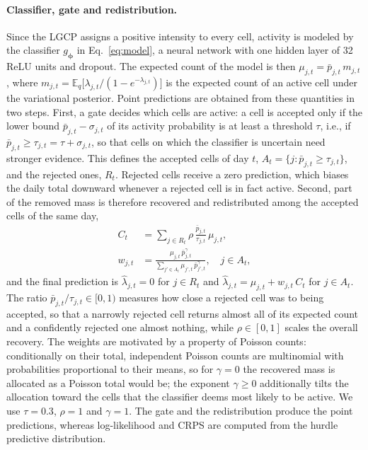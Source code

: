 \paragraph{Classifier, gate and redistribution.}
Since the LGCP assigns a positive intensity to every cell, activity is modeled by the classifier $g_{\boldsymbol{\phi}}$ in Eq.~\eqref{eq:model}, a neural network with one hidden layer of 32 ReLU units and dropout. The expected count of the model is then $\mu_{j,t}=\bar p_{j,t}\,m_{j,t}$, where $m_{j,t}=\mathbb{E}_q\bigl[\lambda_{j,t}/(1-e^{-\lambda_{j,t}})\bigr]$ is the expected count of an active cell under the variational posterior. Point predictions are obtained from these quantities in two steps. First, a gate decides which cells are active: a cell is accepted only if the lower bound $\bar p_{j,t}-\sigma_{j,t}$ of its activity probability is at least a threshold $\tau$, i.e., if $\bar p_{j,t}\geq\tau_{j,t}=\tau+\sigma_{j,t}$, so that cells on which the classifier is uncertain need stronger evidence. This defines the accepted cells of day $t$, $A_t=\{j:\bar p_{j,t}\geq\tau_{j,t}\}$, and the rejected ones, $R_t$. Rejected cells receive a zero prediction, which biases the daily total downward whenever a rejected cell is in fact active. Second, part of the removed mass is therefore recovered and redistributed among the accepted cells of the same day,
\begin{equation}
    \begin{aligned}
        C_t&=\sum_{j\in R_t}\rho\,\frac{\bar p_{j,t}}{\tau_{j,t}}\,\mu_{j,t},\\
        w_{j,t}&=\frac{\mu_{j,t}\,\bar p_{j,t}^{\gamma}}{\sum_{j'\in A_t}\mu_{j',t}\,\bar p_{j',t}^{\gamma}},\quad j\in A_t,
    \end{aligned}
\end{equation}
and the final prediction is $\widehat{\lambda}_{j,t}=0$ for $j\in R_t$ and $\widehat{\lambda}_{j,t}=\mu_{j,t}+w_{j,t}\,C_t$ for $j\in A_t$. The ratio $\bar p_{j,t}/\tau_{j,t}\in[0,1)$ measures how close a rejected cell was to being accepted, so that a narrowly rejected cell returns almost all of its expected count and a confidently rejected one almost nothing, while $\rho\in[0,1]$ scales the overall recovery. The weights are motivated by a property of Poisson counts: conditionally on their total, independent Poisson counts are multinomial with probabilities proportional to their means, so for $\gamma=0$ the recovered mass is allocated as a Poisson total would be; the exponent $\gamma\geq0$ additionally tilts the allocation toward the cells that the classifier deems most likely to be active. We use $\tau=0.3$, $\rho=1$ and $\gamma=1$. The gate and the redistribution produce the point predictions, whereas log-likelihood and CRPS are computed from the hurdle predictive distribution.
